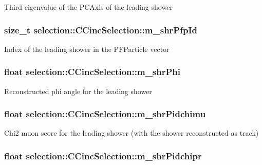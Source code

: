 Third eigenvalue of the P\-C\-Axis of the leading shower \hypertarget{classselection_1_1CCincSelection_ad792c1259135d226df875d1150776ce9}{
\subsubsection[{m\-\_\-shr\-Pfp\-Id}]{\setlength{\rightskip}{0pt plus 5cm}size\-\_\-t selection\-::\-C\-Cinc\-Selection\-::m\-\_\-shr\-Pfp\-Id\hspace{0.3cm}{\ttfamily [private]}}}\label{classselection_1_1CCincSelection_ad792c1259135d226df875d1150776ce9}
Index of the leading shower in the P\-F\-Particle vector \hypertarget{classselection_1_1CCincSelection_ac71dc01edcb5f8f636c802755f4cfb14}{
\subsubsection[{m\-\_\-shr\-Phi}]{\setlength{\rightskip}{0pt plus 5cm}float selection\-::\-C\-Cinc\-Selection\-::m\-\_\-shr\-Phi\hspace{0.3cm}{\ttfamily [private]}}}\label{classselection_1_1CCincSelection_ac71dc01edcb5f8f636c802755f4cfb14}
Reconstructed phi angle for the leading shower \hypertarget{classselection_1_1CCincSelection_a01f6b4b35c15cf072e082eee58665bd0}{
\subsubsection[{m\-\_\-shr\-Pidchimu}]{\setlength{\rightskip}{0pt plus 5cm}float selection\-::\-C\-Cinc\-Selection\-::m\-\_\-shr\-Pidchimu\hspace{0.3cm}{\ttfamily [private]}}}\label{classselection_1_1CCincSelection_a01f6b4b35c15cf072e082eee58665bd0}
Chi2 muon score for the leading shower (with the shower reconstructed as track) \hypertarget{classselection_1_1CCincSelection_a23975eb02710fef71c363a9dd8ed808b}{
\subsubsection[{m\-\_\-shr\-Pidchipr}]{\setlength{\rightskip}{0pt plus 5cm}float selection\-::\-C\-Cinc\-Selection\-::m\-\_\-shr\-Pidchipr\hspace{0.3cm}{\ttfamily [private]}}}\label{classselection_1_1CCincSelection_a23975eb02710fef71c363a9dd8ed808b}
